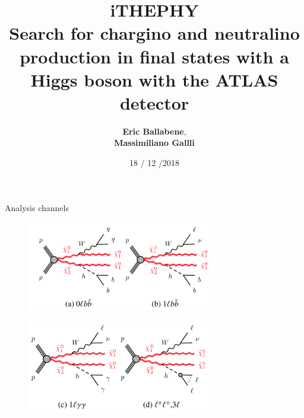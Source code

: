 \documentclass{beamer}
\institute{Universit\`a di Bologna\\Corso di Laurea in Fisica}
\title[Chargino and neutralino production in final states]{iTHEPHY \\
Search for chargino and neutralino production in final states with a Higgs boson with the ATLAS detector}
\author{\textbf{Eric Ballabene},\\ \textbf{Massimiliano Gallli}}
\date{18 / 12 /2018}
\begin{document}
\begin{frame}{}
\titlepage
\end{frame}


\begin{frame}{Analysis channels}
\vskip-0.2cm
\begin{figure}
\includegraphics[width=0.72\textwidth]{fourchannel1}
\end{figure}
\begin{figure}
\includegraphics[width=0.72\textwidth]{fourchannel2}
\end{figure}
\end{frame}
\end{document}
